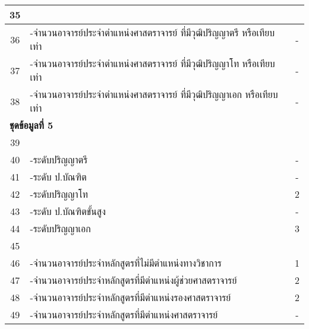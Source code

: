 \begin{longtable}{|c|p{}|c|}
	35&\cellcolor{red!10}{จำนวนอาจารย์ประจำทั้งหมดที่ดำรงตำแหน่งศาสตราจารย์}&\cellcolor{red!10}{\textbf{-}}\\\hline
	36&-จำนวนอาจารย์ประจำตำแหน่งศาสตราจารย์ ที่มีวุฒิปริญญาตรี หรือเทียบเท่า &-\\\hline
	37&-จำนวนอาจารย์ประจำตำแหน่งศาสตราจารย์ ที่มีวุฒิปริญญาโท หรือเทียบเท่า& -\\\hline
	38&-จำนวนอาจารย์ประจำตำแหน่งศาสตราจารย์ ที่มีวุฒิปริญญาเอก หรือเทียบเท่า & -\\\hline
	
	\multicolumn{3}{|l|}{\textbf{ชุดข้อมูลที่ 5}}\\\hline
	39&\cellcolor{red!10}{จำนวนอาจารย์ผู้รับผิดชอบหลักสูตรแยกตามวุฒิการศึกษา}&\cellcolor{red!10}{\textbf{5}}\\\hline
	40&-ระดับปริญญาตรี&-\\\hline
	41&-ระดับ ป.บัณฑิต& - \\\hline
	42&-ระดับปริญญาโท & 2\\\hline
	43&-ระดับ ป.บัณฑิตขั้นสูง& - \\\hline
	44&-ระดับปริญญาเอก& 3   \\\hline
	
	45&\cellcolor{red!10}{จำนวนอาจารย์ผู้รับผิดชอบหลักสูตรที่ดำรงตำแหน่งทางวิชาการ}&\cellcolor{red!10}{\textbf{5}}\\\hline
	46&-จำนวนอาจารย์ประจำหลักสูตรที่ไม่มีตำแหน่งทางวิชาการ&1\\\hline
	47&-จำนวนอาจารย์ประจำหลักสูตรที่มีตำแหน่งผู้ช่วยศาสตราจารย์& 2 \\\hline
	48&-จำนวนอาจารย์ประจำหลักสูตรที่มีตำแหน่งรองศาสตราจารย์ & 2\\\hline
	49&-จำนวนอาจารย์ประจำหลักสูตรที่มีตำแหน่งศาสตราจารย์& - \\\hline
	

\end{longtable}
